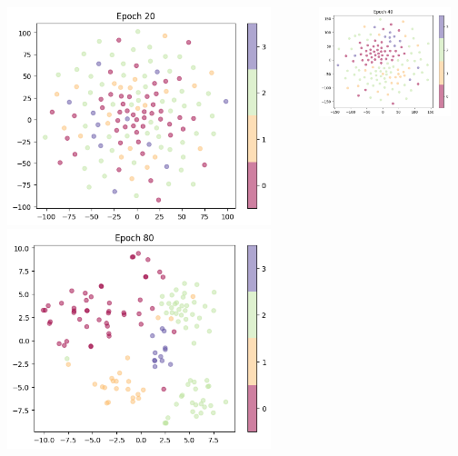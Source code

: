 \documentclass[10pt, aspectratio=169]{beamer}
\begin{document}
\begin{frame}
\begin{columns}
\begin{column}{0.33\textwidth}
           \includegraphics[width=0.9\textwidth]{./graphics/epoch20.png}
           \includegraphics[width=0.9\textwidth]{./graphics/epoch80.png}
       \end{column}
       \begin{column}{0.33\textwidth}
           \centering
           \includegraphics[width=0.9\textwidth]{./graphics/epoch40.png}

\end{column}
\end{columns}
\end{frame}
\end{document}
